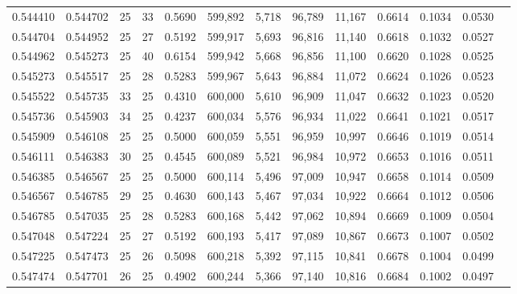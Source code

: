 \begin{tabular}{rrrrrrrrrrrrr}
0.544410 & 0.544702 &    25 &  33 &                                     0.5690 & 599,892 &   5,718 &  96,789 &  11,167 & 0.6614 & 0.1034 & 0.0530 \\
0.544704 & 0.544952 &    25 &  27 &                                     0.5192 & 599,917 &   5,693 &  96,816 &  11,140 & 0.6618 & 0.1032 & 0.0527 \\
0.544962 & 0.545273 &    25 &  40 &                                     0.6154 & 599,942 &   5,668 &  96,856 &  11,100 & 0.6620 & 0.1028 & 0.0525 \\
0.545273 & 0.545517 &    25 &  28 &                                     0.5283 & 599,967 &   5,643 &  96,884 &  11,072 & 0.6624 & 0.1026 & 0.0523 \\
0.545522 & 0.545735 &    33 &  25 &                                     0.4310 & 600,000 &   5,610 &  96,909 &  11,047 & 0.6632 & 0.1023 & 0.0520 \\
0.545736 & 0.545903 &    34 &  25 &                                     0.4237 & 600,034 &   5,576 &  96,934 &  11,022 & 0.6641 & 0.1021 & 0.0517 \\
0.545909 & 0.546108 &    25 &  25 &                                     0.5000 & 600,059 &   5,551 &  96,959 &  10,997 & 0.6646 & 0.1019 & 0.0514 \\
0.546111 & 0.546383 &    30 &  25 &                                     0.4545 & 600,089 &   5,521 &  96,984 &  10,972 & 0.6653 & 0.1016 & 0.0511 \\
0.546385 & 0.546567 &    25 &  25 &                                     0.5000 & 600,114 &   5,496 &  97,009 &  10,947 & 0.6658 & 0.1014 & 0.0509 \\
0.546567 & 0.546785 &    29 &  25 &                                     0.4630 & 600,143 &   5,467 &  97,034 &  10,922 & 0.6664 & 0.1012 & 0.0506 \\
0.546785 & 0.547035 &    25 &  28 &                                     0.5283 & 600,168 &   5,442 &  97,062 &  10,894 & 0.6669 & 0.1009 & 0.0504 \\
0.547048 & 0.547224 &    25 &  27 &                                     0.5192 & 600,193 &   5,417 &  97,089 &  10,867 & 0.6673 & 0.1007 & 0.0502 \\
0.547225 & 0.547473 &    25 &  26 &                                     0.5098 & 600,218 &   5,392 &  97,115 &  10,841 & 0.6678 & 0.1004 & 0.0499 \\
0.547474 & 0.547701 &    26 &  25 &                                     0.4902 & 600,244 &   5,366 &  97,140 &  10,816 & 0.6684 & 0.1002 & 0.0497 \\

\end{tabular}
